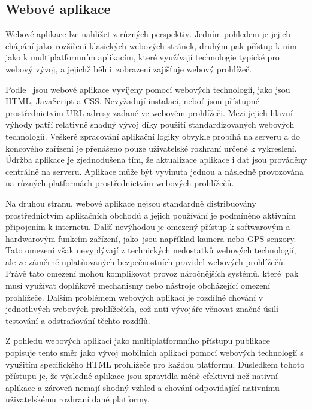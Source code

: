 \subsection{Webové aplikace}
\label{Pwa_sec}
Webové aplikace lze nahlížet z různých perspektiv. Jedním pohledem je jejich chápání jako~rozšíření klasických webových stránek, druhým pak přístup k nim jako k multiplatformním aplikacím, které využívají technologie typické pro webový vývoj, a jejichž běh i~zobrazení zajišťuje webový prohlížeč.

Podle~\cite{Taxonomy} jsou webové aplikace vyvíjeny pomocí webových technologií, jako jsou HTML, JavaScript a CSS. Nevyžadují instalaci, neboť jsou přístupné prostřednictvím URL adresy zadané ve webovém prohlížeči. Mezi jejich hlavní výhody patří relativně snadný vývoj díky použití standardizovaných webových technologií. Veškeré zpracování aplikační logiky obvykle probíhá na serveru a do koncového zařízení je přenášeno pouze uživatelské rozhraní určené k vykreslení. Údržba aplikace je zjednodušena tím, že aktualizace aplikace i dat jsou prováděny centrálně na serveru. Aplikace může být vyvinuta jednou a následně provozována na různých platformách prostřednictvím webových prohlížečů.

Na druhou stranu, webové aplikace nejsou standardně distribuovány prostřednictvím aplikačních obchodů a jejich používání je podmíněno aktivním připojením k internetu. Další nevýhodou je omezený přístup k softwarovým a hardwarovým funkcím zařízení, jako~jsou například kamera nebo GPS senzory. Tato omezení však nevyplývají z technických nedostatků webových technologií, ale ze záměrně uplatňovaných bezpečnostních pravidel webových prohlížečů. Právě tato omezení mohou komplikovat provoz náročnějších systémů, které~pak musí využívat doplňkové mechanismy nebo nástroje obcházející omezení prohlížeče. Dalším problémem webových aplikací je rozdílné chování v jednotlivých webových prohlížečích, což nutí vývojáře věnovat značné úsilí testování a odstraňování těchto rozdílů.

Z pohledu webových aplikací jako multiplatformního přístupu publikace~\cite{CrossPlatform} popisuje tento směr jako vývoj mobilních aplikací pomocí webových technologií s využitím specifického HTML prohlížeče pro každou platformu. Důsledkem tohoto přístupu je, že výsledné aplikace jsou zpravidla méně efektivní než nativní aplikace a zároveň nemají shodný vzhled a chování odpovídající nativnímu uživatelskému rozhraní dané platformy.

